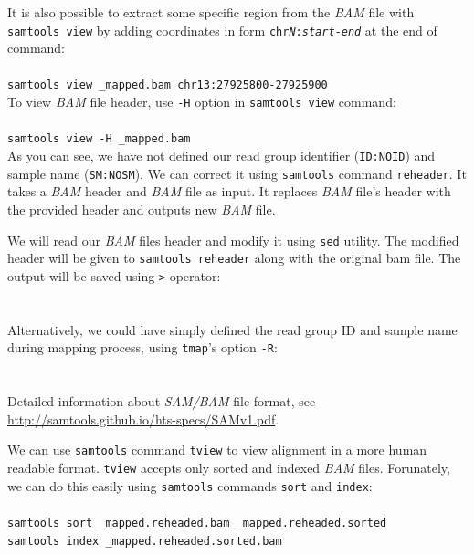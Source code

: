 It is also possible to extract some specific region from the \textit{BAM} file with \texttt{samtools view}
by adding coordinates in form \texttt{chr\textit{N}:\textit{start}-\textit{end}} at the end of command:\\~\\
\texttt{samtools view \mapReads\_mapped.bam chr13:27925800-27925900}\\


To view \textit{BAM} file header, use 
\texttt{-H} option in \texttt{samtools view} command:\\~\\
\texttt{samtools view -H \mapReads\_mapped.bam}\\

As you can see, we have not defined our read group identifier (\texttt{ID:NOID})
and sample name (\texttt{SM:NOSM}). We can correct it using \texttt{samtools}
command \texttt{reheader}. It takes a \textit{BAM} header and \textit{BAM} file
as input. It replaces \textit{BAM} file's header with the provided header and 
outputs new \textit{BAM} file.

We will read our \textit{BAM} files header and modify it using \texttt{sed}
utility. The modified header will be given to \texttt{samtools reheader}
along with the original bam file. The output will be saved using \texttt{>}
operator:\\~\\
\\

Alternatively, we could have simply defined the read group ID and sample name during mapping process,
using \texttt{tmap}'s option \texttt{-R}:\\~\\%
\\


Detailed information about \textit{SAM/BAM} file format, see \url{http://samtools.github.io/hts-specs/SAMv1.pdf}.


We can use \texttt{samtools} command \texttt{tview} to view alignment in a
more human readable format. \texttt{tview} accepts only 
sorted and indexed \textit{BAM} files. Forunately, we can
do this easily using \texttt{samtools} commands 
\texttt{sort} and \texttt{index}:\\~\\
\texttt{samtools sort \mapReads\_mapped.reheaded.bam \mapReads\_mapped.reheaded.sorted}\\
\texttt{samtools index \mapReads\_mapped.reheaded.sorted.bam}\\

